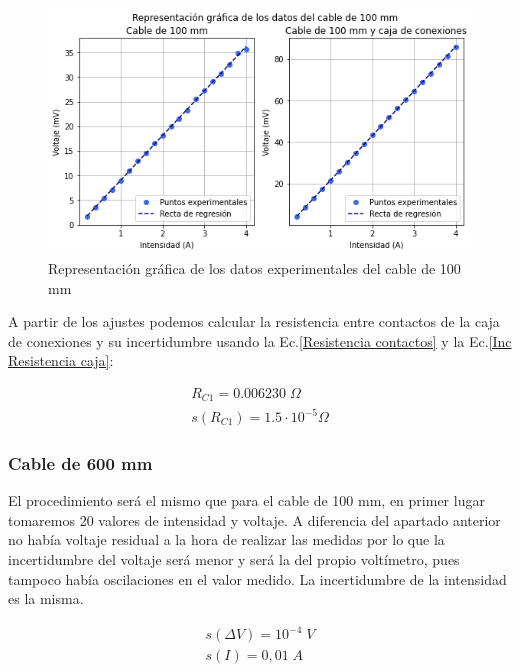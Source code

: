 \documentclass[a4paper,12pt,titlepage]{report}
\begin{document}
\begin{figure}[h!]
    \centering
    \includegraphics[width=0.9\linewidth]{Images/plotCable1.png}
    \caption{Representación gráfica de los datos experimentales del cable de 100 mm}
\end{figure}

A partir de los ajustes podemos calcular la resistencia entre contactos de la caja de conexiones y su incertidumbre usando la Ec.\ref{Resistencia contactos} y la Ec.\ref{Inc Resistencia caja}:

\begin{equation}
    \begin{gathered}
        R_{C1} = 0.006230 \; \Omega\\
        s(R_{C1}) = 1.5 \cdot 10^{-5} \Omega
    \end{gathered}
\end{equation}

\newpage

\subsubsection{Cable de 600 mm}

El procedimiento será el mismo que para el cable de 100 mm, en primer lugar tomaremos 20 valores de intensidad y voltaje. A diferencia del apartado anterior no había voltaje residual a la hora de realizar las medidas por lo que la incertidumbre del voltaje será menor y será la del propio voltímetro, pues tampoco había oscilaciones en el valor medido. La incertidumbre de la intensidad es la misma.

\begin{equation}
    \begin{gathered}
        s(\Delta V) = 10^{-4} \; V \\
        s(I) = 0,01\; A
    \end{gathered}
\end{equation}
\end{document}
